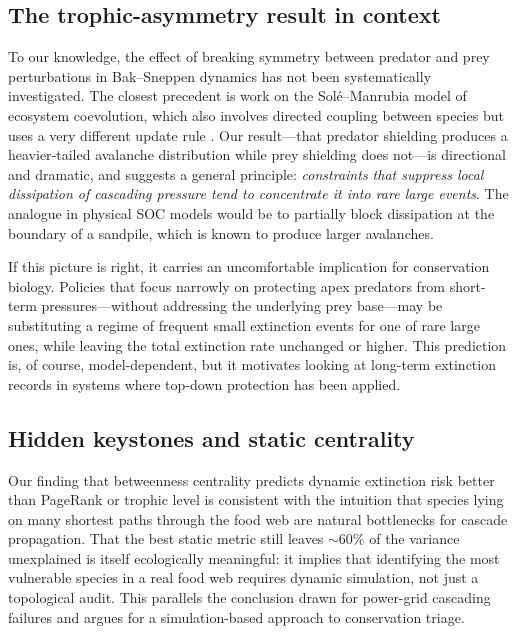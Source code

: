 \documentclass[10pt,a4paper,twocolumn]{article}
\begin{document}
\subsection{The trophic-asymmetry result in context}
To our knowledge, the effect of breaking symmetry between predator and prey perturbations in Bak--Sneppen dynamics has not been systematically investigated. The closest precedent is work on the Sol\'e--Manrubia model of ecosystem coevolution, which also involves directed coupling between species but uses a very different update rule \citep{sole1996extinction}. Our result---that predator shielding produces a heavier-tailed avalanche distribution while prey shielding does not---is directional and dramatic, and suggests a general principle: \emph{constraints that suppress local dissipation of cascading pressure tend to concentrate it into rare large events}. The analogue in physical SOC models would be to partially block dissipation at the boundary of a sandpile, which is known to produce larger avalanches.

If this picture is right, it carries an uncomfortable implication for conservation biology. Policies that focus narrowly on protecting apex predators from short-term pressures---without addressing the underlying prey base---may be substituting a regime of frequent small extinction events for one of rare large ones, while leaving the total extinction rate unchanged or higher. This prediction is, of course, model-dependent, but it motivates looking at long-term extinction records in systems where top-down protection has been applied.

\subsection{Hidden keystones and static centrality}
Our finding that betweenness centrality predicts dynamic extinction risk better than PageRank or trophic level is consistent with the intuition that species lying on many shortest paths through the food web are natural bottlenecks for cascade propagation. That the best static metric still leaves $\sim$60\% of the variance unexplained is itself ecologically meaningful: it implies that identifying the most vulnerable species in a real food web requires dynamic simulation, not just a topological audit. This parallels the conclusion drawn for power-grid cascading failures \citep{dobson2007complex} and argues for a simulation-based approach to conservation triage.
\end{document}
